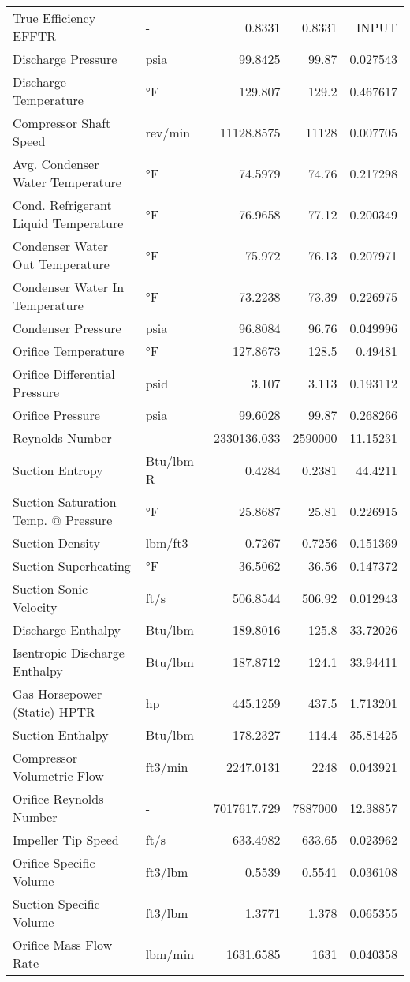 \begin{table}[htbp]
\begin{tabular}{llrrr}
    True Efficiency EFFTR & -     & 0.8331 & 0.8331 & INPUT \\
    Discharge Pressure & psia  & 99.8425 & 99.87 & 0.027543 \\
    Discharge Temperature & °F    & 129.807 & 129.2 & 0.467617 \\
    Compressor Shaft Speed & rev/min & 11128.8575 & 11128 & 0.007705 \\
    Avg. Condenser Water Temperature & °F    & 74.5979 & 74.76 & 0.217298 \\
    Cond. Refrigerant Liquid Temperature & °F    & 76.9658 & 77.12 & 0.200349 \\
    Condenser Water Out Temperature & °F    & 75.972 & 76.13 & 0.207971 \\
    Condenser Water In Temperature & °F    & 73.2238 & 73.39 & 0.226975 \\
    Condenser Pressure & psia  & 96.8084 & 96.76 & 0.049996 \\
    Orifice Temperature & °F    & 127.8673 & 128.5 & 0.49481 \\
    Orifice Differential Pressure & psid  & 3.107 & 3.113 & 0.193112 \\
    Orifice Pressure & psia  & 99.6028 & 99.87 & 0.268266 \\
    Reynolds Number & -     & 2330136.033 & 2590000 & 11.15231 \\
    Suction Entropy & Btu/lbm-R & 0.4284 & 0.2381 & 44.4211 \\
    Suction Saturation Temp. @ Pressure & °F    & 25.8687 & 25.81 & 0.226915 \\
    Suction Density & lbm/ft3 & 0.7267 & 0.7256 & 0.151369 \\
    Suction Superheating & °F    & 36.5062 & 36.56 & 0.147372 \\
    Suction Sonic Velocity & ft/s  & 506.8544 & 506.92 & 0.012943 \\
    Discharge Enthalpy & Btu/lbm & 189.8016 & 125.8 & 33.72026 \\
    Isentropic Discharge Enthalpy & Btu/lbm & 187.8712 & 124.1 & 33.94411 \\
    Gas Horsepower (Static) HPTR & hp    & 445.1259 & 437.5 & 1.713201 \\
    Suction Enthalpy & Btu/lbm & 178.2327 & 114.4 & 35.81425 \\
    Compressor Volumetric Flow & ft3/min & 2247.0131 & 2248  & 0.043921 \\
    Orifice Reynolds Number & -     & 7017617.729 & 7887000 & 12.38857 \\
    Impeller Tip Speed & ft/s  & 633.4982 & 633.65 & 0.023962 \\
    Orifice Specific Volume & ft3/lbm & 0.5539 & 0.5541 & 0.036108 \\
    Suction Specific Volume & ft3/lbm & 1.3771 & 1.378 & 0.065355 \\
    Orifice Mass Flow Rate & lbm/min & 1631.6585 & 1631  & 0.040358 \\
    \bottomrule
    \end{tabular}%
\end{table}%

